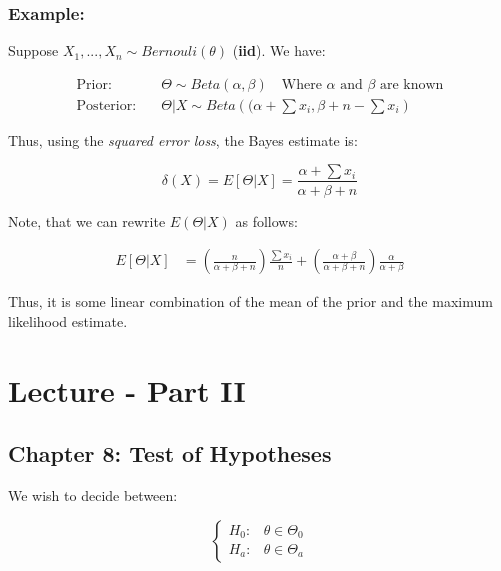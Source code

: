 \documentclass{article}
\begin{document}
\subsubsection*{Example:}

Suppose $X_1,...,X_n \sim Bernouli(\theta)$ (\textbf{iid}). We have:

\begin{equation*}
    \begin{split}
        \text{Prior:}\quad &\Theta \sim Beta(\alpha,\beta) \quad \text{Where $\alpha$ and $\beta$ are known}\\
        \text{Posterior:}\quad &\Theta | X \sim Beta\left((\alpha + \sum x_i, \beta + n - \sum x_i\right)
    \end{split}
\end{equation*}

Thus, using the \textit{squared error loss}, the Bayes estimate is:

\begin{equation*}
    \delta (X) = E[\Theta | X] = \frac{\alpha + \sum x_i}{\alpha + \beta + n}
\end{equation*}

Note, that we can rewrite $E(\Theta|X)$ as follows:

\begin{equation*}
    \begin{split}
        E[\Theta|X] &= \left(\frac{n}{\alpha+\beta+n} \right) \frac{\sum x_i}{n} + \left(\frac{\alpha+\beta}{\alpha+\beta+n} \right)\frac{\alpha}{\alpha+\beta}
    \end{split}
\end{equation*}

Thus, it is some linear combination of the mean of the prior and the maximum likelihood estimate.


\section{Lecture - Part II}

\subsection{Chapter 8: Test of Hypotheses}

We wish to decide between:

\begin{equation*}
    \begin{cases}
        H_0: & \theta \in \Theta_0\\
        H_a: & \theta \in \Theta_a
    \end{cases}
\end{equation*}
\end{document}
